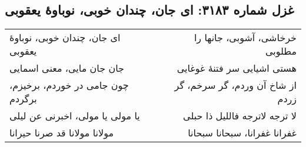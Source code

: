 \begin{center}
\section*{غزل شماره ۳۱۸۳: ای جان، چندان خوبی، نوباوهٔ یعقوبی}
\label{sec:3183}
\begin{longtable}{l p{0.5cm} r}
ای جان، چندان خوبی، نوباوهٔ یعقوبی
&&
خرخاشی، آشوبی، جانها را مطلوبی
\\
جان جان مایی، معنی اسمایی
&&
هستی اشیایی سر فتنهٔ غوغایی
\\
چون جامی در خوردم، برخیزم، برگردم
&&
از شاخ آن وردم، گر سرخم، گر زردم
\\
یا مولی یا مولی، اخبرنی عن لیلی
&&
لا ترجه لاترجه فاللیل ذا حبلی
\\
مولانا مولانا قد صرنا حیرانا
&&
غفرانا غفرانا، سبحانا سبحانا
\\
\end{longtable}
\end{center}

